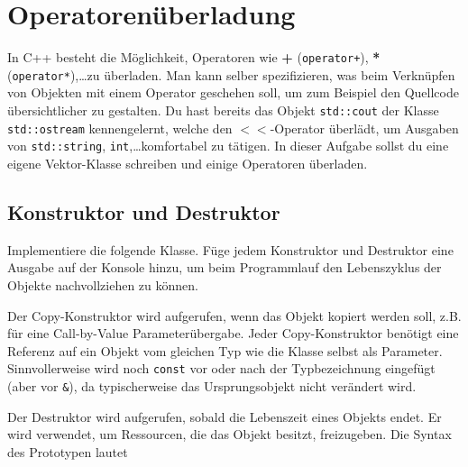\section{\ExercisePrefixBasics Operatorenüberladung}
In C++ besteht die Möglichkeit, Operatoren wie \textbf{+} (\lstinline{operator+}), \textbf{*} (\lstinline{operator*}),\dots zu überladen.
Man kann selber spezifizieren, was beim Verknüpfen von Objekten mit einem Operator geschehen soll, um zum Beispiel den Quellcode übersichtlicher zu gestalten.
Du hast bereits das Objekt \lstinline{std::cout} der Klasse \lstinline{std::ostream} kennengelernt, welche den $<<$-Operator überlädt, um Ausgaben von \lstinline{std::string}, \lstinline{int},\dots komfortabel zu tätigen.
In dieser Aufgabe sollst du eine eigene Vektor-Klasse schreiben und einige Operatoren überladen.


\subsection{Konstruktor und Destruktor}
Implementiere die folgende Klasse.
Füge jedem Konstruktor und Destruktor eine Ausgabe auf der Konsole hinzu, um beim Programmlauf den Lebenszyklus der Objekte nachvollziehen zu können.

  

Der Copy-Konstruktor wird aufgerufen, wenn das Objekt kopiert werden soll, z.B. für eine Call-by-Value Parameterübergabe.
Jeder Copy-Konstruktor benötigt eine Referenz auf ein Objekt vom gleichen Typ wie die Klasse selbst als Parameter. 
Sinnvollerweise wird noch \lstinline{const} vor oder nach der Typbezeichnung eingefügt (aber vor \lstinline{&}), da typischerweise das Ursprungsobjekt nicht verändert wird.

Der Destruktor wird aufgerufen, sobald die Lebenszeit eines Objekts endet. Er wird verwendet, um Ressourcen, die das Objekt besitzt, freizugeben.
Die Syntax des Prototypen lautet

  

